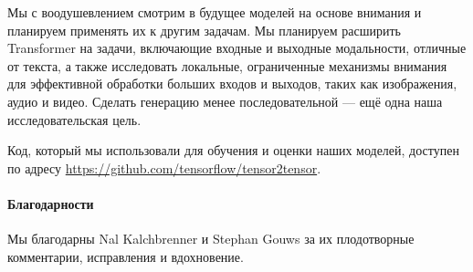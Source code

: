 \documentclass{article}
\begin{document}
Мы с воодушевлением смотрим в будущее моделей на основе внимания и планируем применять их к другим задачам. Мы планируем расширить Transformer на задачи, включающие входные и выходные модальности, отличные от текста, а также исследовать локальные, ограниченные механизмы внимания для эффективной обработки больших входов и выходов, таких как изображения, аудио и видео.
Сделать генерацию менее последовательной — ещё одна наша исследовательская цель.

Код, который мы использовали для обучения и оценки наших моделей, доступен по адресу \url{https://github.com/tensorflow/tensor2tensor}.

\paragraph{Благодарности} Мы благодарны Nal Kalchbrenner и Stephan Gouws за их плодотворные комментарии, исправления и вдохновение.


%
\end{document}
